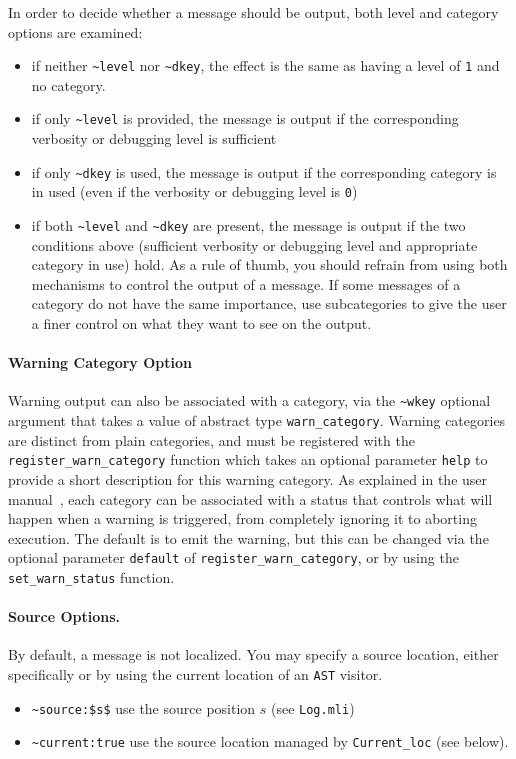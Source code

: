In order to decide whether a message should be output, both level and category
options are examined:
\begin{itemize}
\item if neither \lstinline|~level| nor \lstinline|~dkey|, the effect is the
  same as having a level of \lstinline|1| and no category.
\item if only \lstinline|~level| is provided, the message is output if the
  corresponding verbosity or debugging level is sufficient
\item if only \lstinline|~dkey| is used, the message is output if the
  corresponding category is in used
  (even if the verbosity or debugging level is \lstinline|0|)
\item if both \lstinline|~level| and \lstinline|~dkey| are present,
  the message is output if the two conditions above
  (sufficient verbosity or debugging level and appropriate category in use)
  hold. As a rule of thumb, you should refrain from using both mechanisms to
  control the output of a message. If some messages of a category do not have
  the same importance, use subcategories to give the user a finer control on
  what they want to see on the output.
\end{itemize}

\paragraph{Warning Category Option} Warning output can also be associated with a
category, via the \lstinline|~wkey| optional argument that takes a value of
abstract type 
\lstinline|warn_category|. Warning categories are distinct from plain
categories, and must be registered with the
\lstinline|register_warn_category| function which takes an optional parameter
\lstinline|help| to provide a short description for this warning category. As
explained in the user manual~\cite{userman}, each category can be associated
with a status that controls what will happen when a warning is triggered, from
completely ignoring it to aborting execution. The default is to emit the
warning, but this can be changed via the optional parameter \lstinline|default|
of \lstinline|register_warn_category|, or by using the
\lstinline|set_warn_status| function.

\paragraph{Source Options.} By default, a message is not localized. You may
specify a source location, either specifically or by using the current
location of an \texttt{AST} visitor.
\lstset{style=frama-c-style,language=}
\begin{itemize}
\item[] \lstinline{~source:$s$} use the source position $s$ (see \texttt{Log.mli})
\item[] \lstinline{~current:true} use the source location
  managed by \texttt{Current\_loc} (see below).
\end{itemize}

